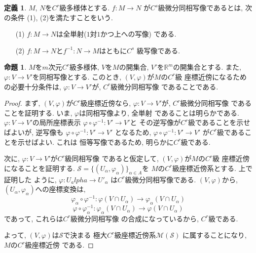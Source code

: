 \documentclass[a4j,12pt]{jarticle}
\theoremstyle{definition}
\newtheorem{definition}[theorem]{定義}
\newtheorem{proposition}[theorem]{命題}
\begin{document}
\begin{definition}\label{def:C^s deffeomorphism}
    $M$, $N$を$C^r$級多様体とする. $f:M\to N$
    が$C^s$級微分同相写像であるとは, 次の条件
    (1), (2)を満たすことをいう. 
    \begin{itemize}
        \item[(1)]
        $f:M\to N$は全単射($1$対$1$かつ上への写像)
        である. 
        \item[(2)] 
        $f:M\to N$と$f^{-1}:N\to M$はともに$C^s$
        級写像である. 
    \end{itemize}
\end{definition}
\begin{proposition}\label{prop: cord-nabor condition}
    $M$を$m$次元$C^r$級多様体, $V$を$M$の開集合, 
    $V'$を$\mathbb{R}^m$の開集合とする. また, 
    $\varphi:V\to V'$を同相写像とする. 
    このとき, $(V,\varphi)$が$M$の$C^r$級
    座標近傍になるための必要十分条件は, 
    $\varphi:V\to V'$が, $C^r$級微分同相写像
    であることである. 
\end{proposition}
\begin{proof}
    まず, $(V,\varphi)$が$C^r$級座標近傍なら, 
    $\varphi:V\to V'$が, $C^r$級微分同相写像
    であることを証明する. 
    いま, $\varphi$は同相写像より, 全単射
    であることは明らかである. 
    $\varphi:V\to V'$の局所座標表示
    $\varphi \circ\varphi^{-1}:V'\to V'$と
    その逆写像が$C^r$級であることを示せばよいが, 
    逆写像も
    $\varphi \circ\varphi^{-1}:V'\to V'$
    となるため, 
    $\varphi \circ\varphi^{-1}:V'\to V'$
    が$C^r$級であることを示せばよい. これは
    恒等写像であるため, 明らかに$C^r$級である. 

    次に, $\varphi:V\to V'$が$C^r$級同相写像
    であると仮定して, $(V,\varphi)$が$M$の$C^r$級
    座標近傍になることを証明する. 
    $\mathcal{S}=\{(U_\alpha,
    \varphi_\alpha)\}_{\alpha\in A}$を
    $M$の$C^r$級座標近傍系とする. 上で証明した
    ように, $\varphi:U_alpha\to U'_\alpha$
    は$C^r$級微分同相写像である. 
    $(V,\varphi)$から, $(U_\alpha,
    \varphi_\alpha)$への座標変換は, 
    $$\varphi_\alpha \circ \varphi^{-1}:
    \varphi(V\cap U_\alpha)\to 
    \varphi_\alpha(V\cap U_\alpha)$$
    $$\varphi \circ \varphi_\alpha^{-1}:
    \varphi_\alpha(V\cap U_\alpha)\to 
    \varphi(V\cap U_\alpha)$$
    であって, これらは$C^r$級微分同相写像
    の合成になっているから, $C^r$級である. 

    よって, $(V,\varphi)$は$\mathcal{S}$で決まる
    極大$C^r$級座標近傍系$\mathcal{M}(\mathcal{S})$
    に属することになり, $M$の$C^r$級座標近傍
    である. 
\end{proof}
%
\end{document}
